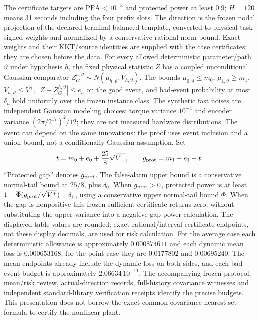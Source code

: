 \documentclass[11pt]{article}
\begin{document}
The certificate targets are $\mathrm{PFA}<10^{-3}$ and protected power
at least $0.9$; $H=120$ means 31 seconds including the four prefix slots.
The direction is the frozen nodal projection of the declared terminal-balanced
template, converted to physical task-signed weights and normalized by a
conservative rational norm bound. Exact weights and their KKT/source identities
are supplied with the case certificates; they are chosen before the data.
For every allowed deterministic parameter/path $\vartheta$ under hypothesis $h$,
the fixed physical statistic $Z$ has a coupled unconditional Gaussian comparator
$Z_G^{h,\vartheta}\sim N(\mu_{h,\vartheta},V_{h,\vartheta})$.
The bounds $\mu_{0,\vartheta}\le m_0$, $\mu_{1,\vartheta}\ge m_1$,
$V_{h,\vartheta}\le V^+$, $|Z-Z_G^{h,\vartheta}|\le e_h$ on the good event,
and bad-event probability at most $\delta_h$ hold uniformly over the frozen
instance class. The synthetic fast noises are independent Gaussian modeling
choices: torque variance $10^{-4}$ and encoder variance
$(2\pi/2^{17})^2/12$; they are not measured hardware distributions.
The event can depend on the same innovations: the proof uses event
inclusion and a union bound, not a conditionally Gaussian assumption.
Set
\[
t=m_0+e_0+\frac{25}{8}\sqrt{V^+},\qquad
g_{\rm prot}=m_1-e_1-t.
\]
``Protected gap'' denotes $g_{\rm prot}$. The false-alarm upper bound is
a conservative normal-tail bound at $25/8$, plus $\delta_0$.
When $g_{\rm prot}>0$, protected power is at least
$1-\overline\Phi(g_{\rm prot}/\sqrt{V^+})-\delta_1$, using a conservative
upper normal-tail bound $\overline\Phi$. When the gap is nonpositive this
frozen sufficient certificate returns zero, without substituting the upper
variance into a negative-gap power calculation.
The displayed table values are rounded; exact rational/interval certificate
endpoints, not these display decimals, are used for risk calculation.
For the average case each deterministic allowance is approximately
$0.000874611$ and each dynamic mean loss is $0.000653168$;
for the point case they are $0.0177802$ and $0.00695240$.
The mean endpoints already include the dynamic loss on both sides, and each
bad-event budget is approximately $2.06634\,10^{-11}$.
The accompanying frozen protocol, mean/risk review, actual-direction records,
full-history covariance witnesses and independent standard-library verification
receipts identify the precise budgets. This presentation does not borrow the
exact common-covariance nearest-set formula to certify the nonlinear plant.
\end{document}
